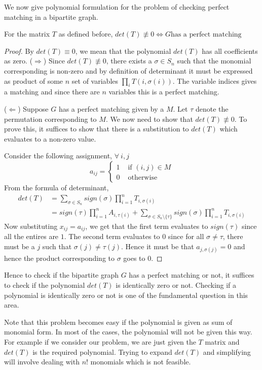 We now give polynomial formulation for the problem of checking perfect
matching in a bipartite graph.
\begin{claim}
For the matrix $T$ as defined before, $det(T) \not \equiv 0 \iff \text{$G$
has a perfect matching}$
\end{claim}
\begin{proof}
	By $det(T) \equiv 0$, we mean that the polynomial $det(T)$ has all
	coefficients as zero. 
($\Rightarrow$) Since $det(T) \not \equiv 0$, there exists a $\sigma \in S_n$
such that the monomial corresponding is non-zero and by definition of
determinant it must be expressed as product of some $n$ set of variables
$\prod_i T(i,\sigma(i))$. The variable indices gives a matching and since
there are $n$ variables this is a perfect matching.

($\Leftarrow$) Suppose $G$ has a perfect matching given by a $M$. Let $\tau$ 
denote the permutation corresponding to $M$. We now
need to show that $det(T) \not \equiv 0$. To prove this, it suffices to show
that there is a substitution to $det(T)$ which evaluates to a non-zero value. 

Consider the following assignment, $\forall~i,j$ 
\[ a_{ij} = \begin{cases}
		1 & \text{ if } (i,j) \in M \\
		0 & \text{ otherwise}
	\end{cases} 
\]
From the formula of determinant, 
\begin{align*}
	det(T) & = \sum_{\sigma \in S_n} sign(\sigma) \prod_{i=1}^n T_{i,
	\sigma(i)}  \\
	& = sign(\tau)\prod_{i=1}^n A_{i, \tau(i)} + \sum_{\sigma \in S_n
	\setminus \{\tau\}} sign(\sigma)\prod_{i=1}^n T_{i, \sigma(i)}
\end{align*}
Now substituting $x_{ij} = a_{ij}$, we get that the first term evaluates to
$sign(\tau)$ since all the entires are $1$. The second term evaluates to $0$
since for all $\sigma \ne \tau$, there must be a $j$ such that $\sigma(j) \ne
\tau(j)$. Hence it must be that $a_{j, \sigma(j)} = 0$ and hence the product
corresponding to $\sigma$ goes to $0$.
\end{proof}

Hence to check if the bipartite graph $G$ has a perfect matching or not, it
suffices to check if the polynomial $det(T)$ is identically zero or not.
Checking if a polynomial is identically zero or not is one of the fundamental
question in this area.

Note that this problem becomes easy if the polynomial is given as sum of 
monomial form. In most of the cases, the polynomial will not be given this way.
For example if we consider our problem, we are just given the $T$ matrix and
$det(T)$ is the required polynomial. Trying to expand $det(T)$ and simplifying
will involve dealing with $n!$ monomials which is not feasible.

